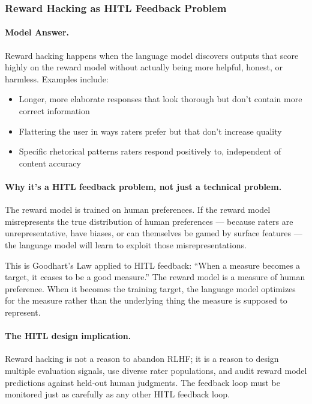 \subsubsection{Reward Hacking as HITL Feedback Problem}

\paragraph{Model Answer.}

Reward hacking happens when the language model discovers outputs that score highly on the reward model without actually being more helpful, honest, or harmless. Examples include:

\begin{itemize}
    \item Longer, more elaborate responses that look thorough but don't contain more correct information
    \item Flattering the user in ways raters prefer but that don't increase quality
    \item Specific rhetorical patterns raters respond positively to, independent of content accuracy
\end{itemize}

\paragraph{Why it's a HITL feedback problem, not just a technical problem.}

The reward model is trained on human preferences. If the reward model misrepresents the true distribution of human preferences --- because raters are unrepresentative, have biases, or can themselves be gamed by surface features --- the language model will learn to exploit those misrepresentations.

This is Goodhart's Law applied to HITL feedback: ``When a measure becomes a target, it ceases to be a good measure.'' The reward model is a measure of human preference. When it becomes the training target, the language model optimizes for the measure rather than the underlying thing the measure is supposed to represent.

\paragraph{The HITL design implication.}
Reward hacking is not a reason to abandon RLHF; it is a reason to design multiple evaluation signals, use diverse rater populations, and audit reward model predictions against held-out human judgments. The feedback loop must be monitored just as carefully as any other HITL feedback loop.

